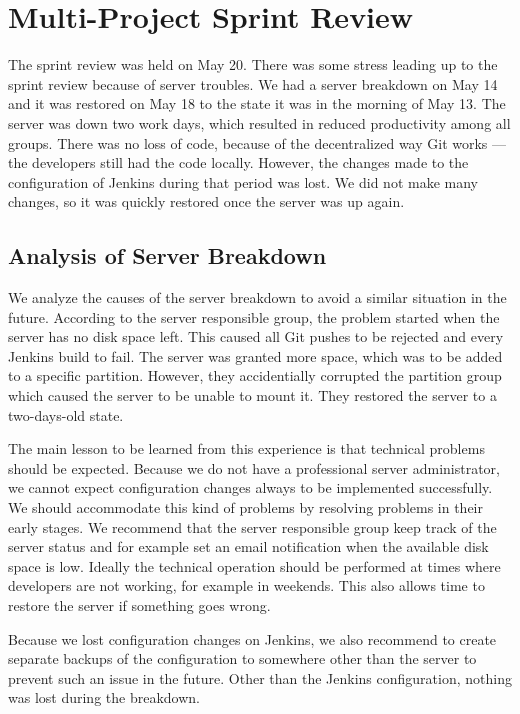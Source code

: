 \section{Multi-Project Sprint Review}\label{sec:s4_multiprj_review}
The sprint review was held on May 20. There was some stress leading up to the sprint review because of server troubles. We had a server breakdown on May 14 and it was restored on May 18 to the state it was in the morning of May 13. The server was down two work days, which resulted in reduced productivity among all groups. There was no loss of code, because of the decentralized way Git works --- the developers still had the code locally.  However, the changes made to the configuration of Jenkins during that period was lost. We did not make many changes, so it was quickly restored once the server was up again.

\subsection{Analysis of Server Breakdown}
We analyze the causes of the server breakdown to avoid a similar situation in the future. According to the server responsible group, the problem started when the server has no disk space left. This caused all Git pushes to be rejected and every Jenkins build to fail. The server was granted more space, which was to be added to a specific partition. However, they accidentially corrupted the partition group which caused the server to be unable to mount it. They restored the server to a two-days-old state.

The main lesson to be learned from this experience is that technical problems should be expected. Because we do not have a professional server administrator, we cannot expect configuration changes always to be implemented successfully. We should accommodate this kind of problems by resolving problems in their early stages. We recommend that the server responsible group keep track of the server status and for example set an email notification when the available disk space is low. Ideally the technical operation should be performed at times where developers are not working, for example in weekends. This also allows time to restore the server if something goes wrong.

Because we lost configuration changes on Jenkins, we also recommend to create separate backups of the configuration to somewhere other than the server to prevent such an issue in the future. Other than the Jenkins configuration, nothing was lost during the breakdown.